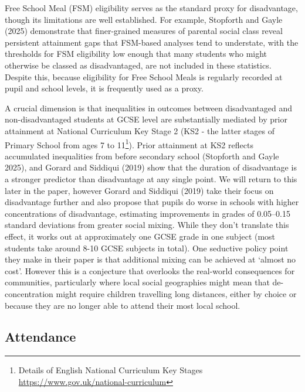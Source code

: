 \documentclass[
  12pt,
  titlepage]{article}
\begin{document}
Free School Meal (FSM) eligibility serves as the standard proxy for
disadvantage, though its limitations are well established. For example,
Stopforth and Gayle (2025) demonstrate that finer-grained measures of
parental social class reveal persistent attainment gaps that FSM-based
analyses tend to understate, with the thresholds for FSM eligibility low
enough that many students who might otherwise be classed as
disadvantaged, are not included in these statistics. Despite this,
because eligibility for Free School Meals is regularly recorded at pupil
and school levels, it is frequently used as a proxy.

A crucial dimension is that inequalities in outcomes between
disadvantaged and non-disadvantaged students at GCSE level are
substantially mediated by prior attainment at National Curriculum Key
Stage 2 (KS2 - the latter stages of Primary School from ages 7 to
11\footnote{Details of English National Curriculum Key Stages
  \url{https://www.gov.uk/national-curriculum}}). Prior attainment at
KS2 reflects accumulated inequalities from before secondary school
(Stopforth and Gayle 2025), and Gorard and Siddiqui (2019) show that the
duration of disadvantage is a stronger predictor than disadvantage at
any single point. We will return to this later in the paper, however
Gorard and Siddiqui (2019) take their focus on disadvantage further and
also propose that pupils do worse in schools with higher concentrations
of disadvantage, estimating improvements in grades of 0.05--0.15
standard deviations from greater social mixing. While they don't
translate this effect, it works out at approximately one GCSE grade in
one subject (most students take around 8-10 GCSE subjects in total). One
seductive policy point they make in their paper is that additional
mixing can be achieved at `almost no cost'. However this is a conjecture
that overlooks the real-world consequences for communities, particularly
where local social geographies might mean that de-concentration might
require children travelling long distances, either by choice or because
they are no longer able to attend their most local school.

\subsection{Attendance}\label{attendance}
\end{document}
